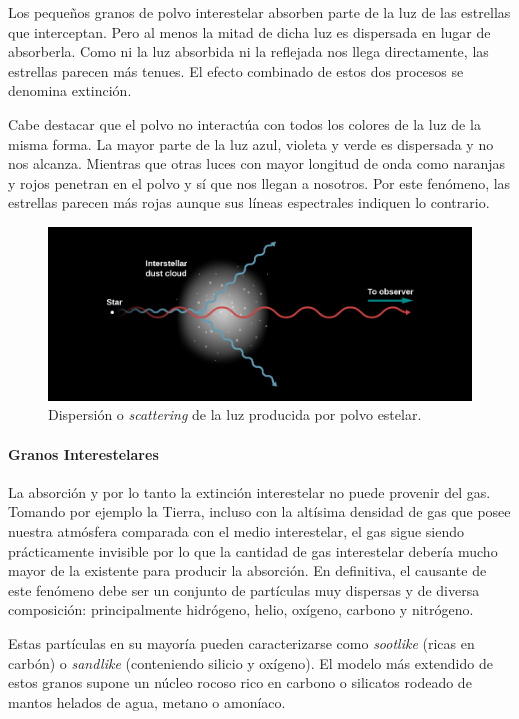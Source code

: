 \documentclass{tufte-handout}
\begin{document}
Los pequeños granos de polvo interestelar absorben parte de la luz de las estrellas que interceptan. Pero al menos la mitad de dicha luz es dispersada en lugar de absorberla. Como ni la luz absorbida ni la reflejada nos llega directamente, las estrellas parecen más tenues. El efecto combinado de estos dos procesos se denomina extinción.

Cabe destacar que el polvo no interactúa con todos los colores de la luz de la misma forma. La mayor parte de la luz azul, violeta y verde es dispersada y no nos alcanza. Mientras que otras luces con mayor longitud de onda como naranjas y rojos penetran en el polvo y sí que nos llegan a nosotros. Por este fenómeno, las estrellas parecen más rojas aunque sus líneas espectrales indiquen lo contrario.

\begin{figure}
  \includegraphics[width=\linewidth]{img/scatter}
  \caption{Dispersión o \emph{scattering} de la luz producida por polvo estelar.}
\end{figure}

\paragraph{Granos Interestelares}

La absorción y por lo tanto la extinción interestelar no puede provenir del gas. Tomando por ejemplo la Tierra, incluso con la altísima densidad de gas que posee nuestra atmósfera comparada con el medio interestelar, el gas sigue siendo prácticamente invisible por lo que la cantidad de gas interestelar debería mucho mayor de la existente para producir la absorción. En definitiva, el causante de este fenómeno debe ser un conjunto de partículas muy dispersas y de diversa composición: principalmente hidrógeno, helio, oxígeno, carbono y nitrógeno.

Estas partículas en su mayoría pueden caracterizarse como \emph{sootlike} (ricas en carbón) o \emph{sandlike} (conteniendo silicio y oxígeno). El modelo más extendido de estos granos supone un núcleo rocoso rico en carbono o silicatos rodeado de mantos helados de agua, metano o amoníaco.
\end{document}

